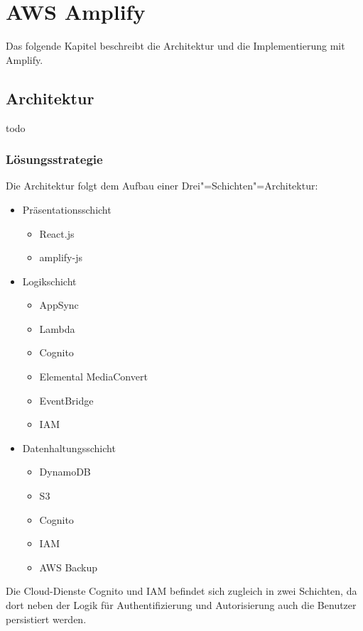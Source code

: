 \chapter{AWS Amplify}

Das folgende Kapitel beschreibt die Architektur und die Implementierung mit Amplify.

\section{Architektur}

todo

\subsection{Lösungsstrategie}

Die Architektur folgt dem Aufbau einer Drei"=Schichten"=Architektur:

\begin{itemize}
  \item Präsentationsschicht
    \begin{itemize}
      \item React.js
      \item amplify-js
    \end{itemize}
  \item Logikschicht
    \begin{itemize}
      \item AppSync
      \item Lambda
      \item Cognito
      \item Elemental MediaConvert
      \item EventBridge
      \item IAM
    \end{itemize}
  \item Datenhaltungsschicht
    \begin{itemize}
      \item DynamoDB
      \item S3
      \item Cognito
      \item IAM
      \item AWS Backup
    \end{itemize}
\end{itemize}

Die Cloud-Dienste Cognito und IAM befindet sich zugleich in zwei Schichten, da dort neben der Logik für Authentifizierung und Autorisierung auch die Benutzer persistiert werden.

